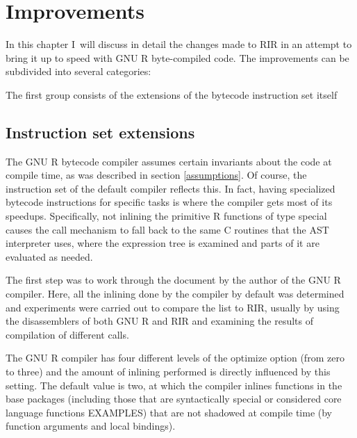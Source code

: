 \chapter{Improvements\label{improvements}}

In this chapter I~will discuss in detail the changes made to RIR in an attempt to bring it up to speed with GNU R byte-compiled code. The improvements can be subdivided into several categories:

The first group consists of the extensions of the bytecode instruction set itself



\section{Instruction set extensions}

The GNU R bytecode compiler assumes certain invariants about the code at compile time, as was described in section \ref{assumptions}. Of course, the instruction set of the default compiler reflects this. In fact, having specialized bytecode instructions for specific tasks is where the compiler gets most of its speedups. Specifically, not inlining the primitive R functions of type \todo[verb]special causes the call mechanism to fall back to the same C routines that the AST interpreter uses, where the expression tree is examined and parts of it are evaluated as needed.


The first step was to work through the document \autocite{compiler} by the author of the GNU R compiler. Here, all the inlining done by the compiler by default was determined and experiments were carried out to compare the list to RIR, usually by using the disassemblers of both GNU R and RIR and examining the results of compilation of different calls.


The GNU R compiler has four different levels of the \todo[verb]optimize option (from zero to three) and the amount of inlining performed is directly influenced by this setting. The default value is two, at which the compiler inlines functions in the base packages (including those that are syntactically special or considered core language functions EXAMPLES) that are not shadowed at compile time (by function arguments and local bindings).


